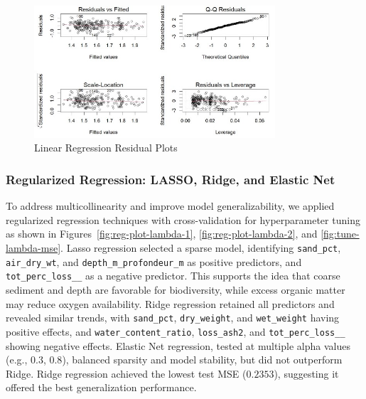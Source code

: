 \documentclass[12pt]{article}
\begin{document}
\begin{figure}[H]
\centering
\includegraphics[width=0.8\textwidth]{linear-regression-residual-plots.jpg}
\caption{Linear Regression Residual Plots}
\label{fig:residual-plots}
\end{figure}


\subsubsection{Regularized Regression: LASSO, Ridge, and Elastic Net}

\qquad To address multicollinearity and improve model generalizability, we
applied regularized regression techniques with cross-validation for
hyperparameter tuning as shown in Figures~\ref{fig:reg-plot-lambda-1},
\ref{fig:reg-plot-lambda-2}, and \ref{fig:tune-lambda-mse}. Lasso regression
selected a sparse model, identifying \texttt{sand\_pct}, \texttt{air\_dry\_wt},
and \texttt{depth\_m\_profondeur\_m} as positive predictors, and
\texttt{tot\_perc\_loss\_\_} as a negative predictor. This supports the idea
that coarse sediment and depth are favorable for biodiversity, while excess
organic matter may reduce oxygen availability. Ridge regression retained all
predictors and revealed similar trends, with \texttt{sand\_pct},
\texttt{dry\_weight}, and \texttt{wet\_weight} having positive effects, and
\texttt{water\_content\_ratio}, \texttt{loss\_ash2}, and
\texttt{tot\_perc\_loss\_\_} showing negative effects. Elastic Net regression,
tested at multiple alpha values (e.g., $0.3$, $0.8$), balanced sparsity and
model stability, but did not outperform Ridge. Ridge regression achieved the
lowest test MSE ($0.2353$), suggesting it offered the best generalization
performance.
\end{document}
